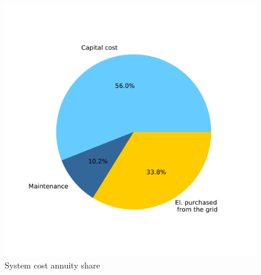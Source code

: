 \documentclass[english]{SPFShortReport}
\begin{document}
\begin{figure}[!htbp]
\begin{center}
\includegraphics[width=1\textwidth]{costShareAnnuity-HydD_mfb30_real_dryN-CityBAS_dryNAc1.0x58.086Vice0.4x58.086HP1.0x18.442-Year0.pdf}
\caption{System cost annuity share}
\label{systemCostannuity}
\end{center}
\end{figure}
\end{document}
